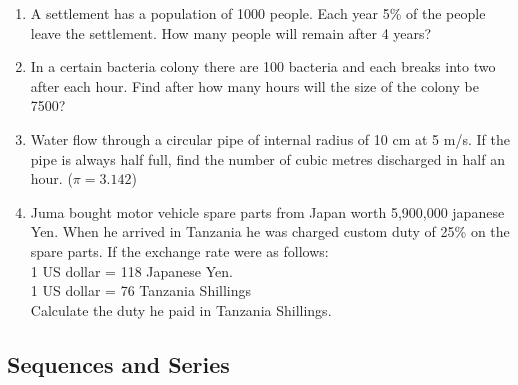 \begin{enumerate}
	\item A settlement has a population of 1000 people. Each year 5\% of the people leave the settlement. How many people will remain after 4 years?
	
	\item In a certain bacteria colony there are 100 bacteria and each breaks into two after each hour. Find after how many hours will the size of the colony be 7500?
	
	\item Water flow through a circular pipe of internal radius of 10 cm at 5 m\slash s. If the pipe is always half full, find the number of cubic metres discharged in half an hour. ($\pi = 3.142$)
	
	\item Juma bought motor vehicle spare parts from Japan worth 5,900,000 japanese Yen. When he arrived in Tanzania he was charged custom duty of 25\% on the spare parts. If the exchange rate were as follows:\\
	1 US dollar = 118 Japanese Yen.\\
	1 US dollar = 76 Tanzania Shillings\\
	Calculate the duty he paid in Tanzania Shillings.



\end{enumerate}	
	
	

	\subsection{Sequences and Series}
	

